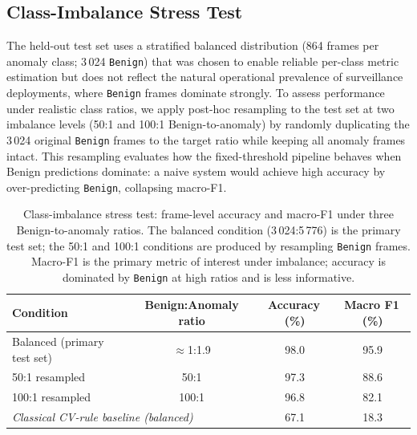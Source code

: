 \documentclass[sensors,article,submit,pdftex,moreauthors]{Definitions/mdpi}
\begin{document}
\subsection{Class-Imbalance Stress Test}
\label{sec:imbalance}
 
The held-out test set uses a stratified balanced distribution (864 frames per anomaly class; 3\,024 \texttt{Benign}) that was chosen to enable reliable per-class metric estimation but does not reflect the natural operational prevalence of surveillance deployments, where \texttt{Benign} frames dominate strongly. To assess performance under realistic class ratios, we apply post-hoc resampling to the test set at two imbalance levels (50:1 and 100:1 Benign-to-anomaly) by randomly duplicating the 3\,024 original \texttt{Benign} frames to the target ratio while keeping all anomaly frames intact. This resampling evaluates how the fixed-threshold pipeline behaves when Benign predictions dominate: a naive system would achieve high accuracy by over-predicting \texttt{Benign}, collapsing macro-F1.
 
\begin{table}[H]
\caption{Class-imbalance stress test: frame-level accuracy and macro-F1 under three Benign-to-anomaly ratios. The balanced condition (3\,024:5\,776) is the primary test set; the 50:1 and 100:1 conditions are produced by resampling \texttt{Benign} frames. Macro-F1 is the primary metric of interest under imbalance; accuracy is dominated by \texttt{Benign} at high ratios and is less informative.}
\label{tab:imbalance}
\centering\small\setlength{\tabcolsep}{8pt}
\begin{tabular}{lccc}
\toprule
\textbf{Condition} & \textbf{Benign:Anomaly ratio} & \textbf{Accuracy\,(\%)} & \textbf{Macro F1\,(\%)} \\
\midrule
Balanced (primary test set)  & $\approx$1:1.9  & 98.0 & 95.9 \\
50:1 resampled               & 50:1            & 97.3 & 88.6 \\
100:1 resampled              & 100:1           & 96.8 & 82.1 \\
\midrule
\multicolumn{2}{l}{\textit{Classical CV-rule baseline (balanced)}} & 67.1 & 18.3 \\
\bottomrule
\end{tabular}
\end{table}
 
\end{document}
